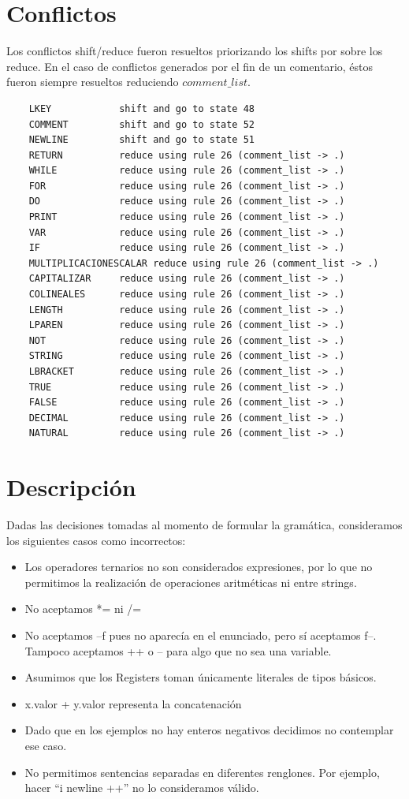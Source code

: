 \documentclass[10pt,a4paper]{article}
\begin{document}
\section{Conflictos}
Los conflictos shift/reduce fueron resueltos priorizando los shifts por sobre los reduce. En el caso de conflictos generados por el fin de un comentario, éstos fueron siempre resueltos reduciendo $comment\_list$.
\begin{verbatim}
    LKEY            shift and go to state 48
    COMMENT         shift and go to state 52
    NEWLINE         shift and go to state 51
    RETURN          reduce using rule 26 (comment_list -> .)
    WHILE           reduce using rule 26 (comment_list -> .)
    FOR             reduce using rule 26 (comment_list -> .)
    DO              reduce using rule 26 (comment_list -> .)
    PRINT           reduce using rule 26 (comment_list -> .)
    VAR             reduce using rule 26 (comment_list -> .)
    IF              reduce using rule 26 (comment_list -> .)
    MULTIPLICACIONESCALAR reduce using rule 26 (comment_list -> .)
    CAPITALIZAR     reduce using rule 26 (comment_list -> .)
    COLINEALES      reduce using rule 26 (comment_list -> .)
    LENGTH          reduce using rule 26 (comment_list -> .)
    LPAREN          reduce using rule 26 (comment_list -> .)
    NOT             reduce using rule 26 (comment_list -> .)
    STRING          reduce using rule 26 (comment_list -> .)
    LBRACKET        reduce using rule 26 (comment_list -> .)
    TRUE            reduce using rule 26 (comment_list -> .)
    FALSE           reduce using rule 26 (comment_list -> .)
    DECIMAL         reduce using rule 26 (comment_list -> .)
    NATURAL         reduce using rule 26 (comment_list -> .)
\end{verbatim}
\section{Descripción}

Dadas las decisiones tomadas al momento de formular la gramática, consideramos los siguientes casos como incorrectos:

\begin{itemize}
\item Los operadores ternarios no son considerados expresiones, por lo que no permitimos la realización de operaciones aritméticas ni entre strings.
\item No aceptamos *= ni /=
\item No aceptamos --f pues no aparecía en el enunciado, pero sí aceptamos f--. Tampoco aceptamos ++ o -- para algo que no sea una variable. 
\item Asumimos que los Registers toman únicamente literales de tipos básicos.
\item x.valor + y.valor representa la concatenación

\item Dado que en los ejemplos no hay enteros negativos decidimos no contemplar ese caso. 
\item No permitimos sentencias separadas en diferentes renglones. Por ejemplo, hacer ``i newline ++'' no lo consideramos válido.
\end{itemize}
\end{document}
